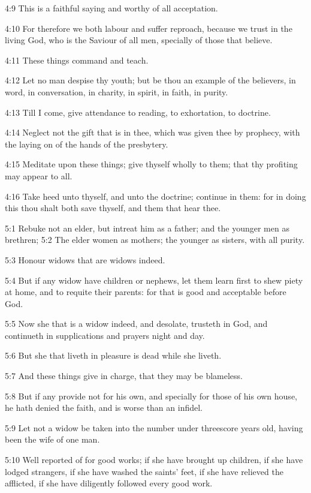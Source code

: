 4:9 This is a faithful saying and worthy of all acceptation.

4:10 For therefore we both labour and suffer reproach, because we trust in the living God, who is the Saviour of all men, specially of those that believe.

4:11 These things command and teach.

4:12 Let no man despise thy youth; but be thou an example of the believers, in word, in conversation, in charity, in spirit, in faith, in purity.

4:13 Till I come, give attendance to reading, to exhortation, to doctrine.

4:14 Neglect not the gift that is in thee, which was given thee by prophecy, with the laying on of the hands of the presbytery.

4:15 Meditate upon these things; give thyself wholly to them; that thy profiting may appear to all.

4:16 Take heed unto thyself, and unto the doctrine; continue in them: for in doing this thou shalt both save thyself, and them that hear thee.

5:1 Rebuke not an elder, but intreat him as a father; and the younger men as brethren; 5:2 The elder women as mothers; the younger as sisters, with all purity.

5:3 Honour widows that are widows indeed.

5:4 But if any widow have children or nephews, let them learn first to shew piety at home, and to requite their parents: for that is good and acceptable before God.

5:5 Now she that is a widow indeed, and desolate, trusteth in God, and continueth in supplications and prayers night and day.

5:6 But she that liveth in pleasure is dead while she liveth.

5:7 And these things give in charge, that they may be blameless.

5:8 But if any provide not for his own, and specially for those of his own house, he hath denied the faith, and is worse than an infidel.

5:9 Let not a widow be taken into the number under threescore years old, having been the wife of one man.

5:10 Well reported of for good works; if she have brought up children, if she have lodged strangers, if she have washed the saints' feet, if she have relieved the afflicted, if she have diligently followed every good work.

